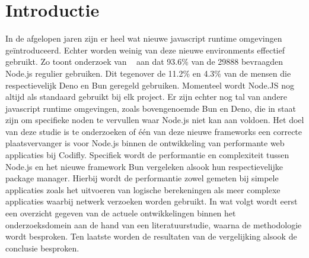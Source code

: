 
\section{Introductie}%
\label{sec:introductie}
In de afgelopen jaren zijn er heel wat nieuwe javascript runtime omgevingen geïntroduceerd. 
Echter worden weinig van deze nieuwe environments effectief gebruikt. 
Zo toont onderzoek van ~\textcite{Greif2022} aan dat 93.6\% van de 29888 bevraagden Node.js regulier gebruiken.
Dit tegenover de 11.2\% en 4.3\% van de mensen die respectievelijk Deno en Bun geregeld gebruiken.
Momenteel wordt Node.JS nog altijd als standaard gebruikt bij elk project. 
Er zijn echter nog tal van andere javascript runtime omgevingen, zoals bovengenoemde Bun en Deno, 
die in staat zijn om specifieke noden te vervullen waar Node.js niet kan aan voldoen.
Het doel van deze studie is te onderzoeken of één van deze nieuwe frameworks een correcte plaatsvervanger is voor Node.js 
binnen de ontwikkeling van performante web applicaties bij Codifly. 
Specifiek wordt de performantie en complexiteit tussen Node.js en het nieuwe framework Bun vergeleken alsook 
hun respectievelijke package manager. 
Hierbij wordt de performantie zowel gemeten bij simpele applicaties zoals het uitvoeren van logische berekeningen
als meer complexe applicaties waarbij netwerk verzoeken worden gebruikt.
In wat volgt wordt eerst een overzicht gegeven van de actuele ontwikkelingen binnen het
onderzoeksdomein aan de hand van een literatuurstudie, waarna de methodologie wordt besproken.
Ten laatste worden de resultaten van de vergelijking alsook de conclusie besproken.



